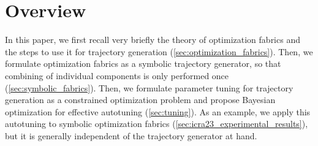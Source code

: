 \section{Overview}
\label{sec:overview}
%
In this paper, we first recall very briefly the theory of optimization fabrics and the steps
to use it for trajectory generation (\cref{sec:optimization_fabrics}). Then, we formulate 
optimization fabrics as a symbolic trajectory generator, so that combining
of individual components is only performed once (\cref{sec:symbolic_fabrics}).
Then, we formulate parameter tuning for trajectory generation as a constrained optimization problem
and propose Bayesian optimization for effective autotuning (\cref{sec:tuning}).  
As an example, we apply this autotuning to symbolic optimization
fabrics (\cref{sec:icra23_experimental_results}), but it is generally 
independent of the trajectory generator at hand.
